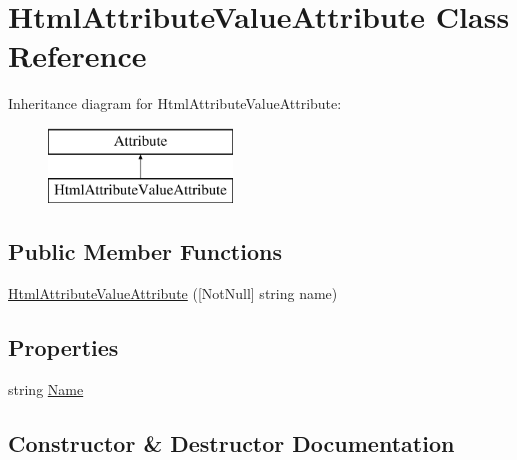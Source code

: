 \hypertarget{class_html_attribute_value_attribute}{}\section{Html\+Attribute\+Value\+Attribute Class Reference}
\label{class_html_attribute_value_attribute}
Inheritance diagram for Html\+Attribute\+Value\+Attribute\+:\begin{figure}[H]
\begin{center}
\leavevmode
\includegraphics[height=2.000000cm]{class_html_attribute_value_attribute}
\end{center}
\end{figure}
\subsection*{Public Member Functions}
\begin{DoxyCompactItemize}
\item 
\mbox{\hyperlink{class_html_attribute_value_attribute_a24f0c95d001e3e601263186ca45098a4}{Html\+Attribute\+Value\+Attribute}} (\mbox{[}Not\+Null\mbox{]} string name)
\end{DoxyCompactItemize}
\subsection*{Properties}
\begin{DoxyCompactItemize}
\item 
string \mbox{\hyperlink{class_html_attribute_value_attribute_ae46f5471839e8bf67fe5177f2b01e514}{Name}}
\end{DoxyCompactItemize}


\subsection{Constructor \& Destructor Documentation}
\mbox{\label{class_html_attribute_value_attribute_a24f0c95d001e3e601263186ca45098a4}} 

